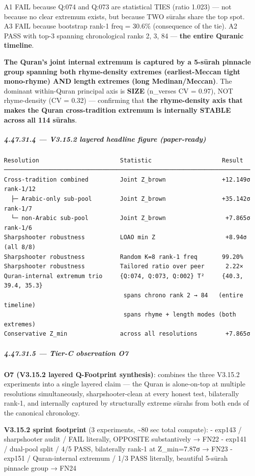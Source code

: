 \documentclass[
]{article}
\begin{document}
A1 FAIL because Q:074 and Q:073 are statistical TIES (ratio 1.023) ---
not because no clear extremum exists, but because TWO sūrahs share the
top spot. A3 FAIL because bootstrap rank-1 freq = 30.6\% (consequence of
the tie). A2 PASS with top-3 spanning chronological ranks 2, 3, 84 ---
\textbf{the entire Quranic timeline}.

\textbf{The Quran's joint internal extremum is captured by a 5-sūrah
pinnacle group spanning both rhyme-density extremes (earliest-Meccan
tight mono-rhyme) AND length extremes (long Medinan/Meccan)}. The
dominant within-Quran principal axis is \textbf{SIZE} (n\_verses CV =
0.97), NOT rhyme-density (CV = 0.32) --- confirming that \textbf{the
rhyme-density axis that makes the Quran cross-tradition extremum is
internally STABLE across all 114 sūrahs}.

\subparagraph{4.47.31.4 --- V3.15.2 layered headline figure
(paper-ready)}\label{v3.15.2-layered-headline-figure-paper-ready}

\begin{verbatim}
Resolution                       Statistic                    Result
──────────────────────────────────────────────────────────────────────
Cross-tradition combined         Joint Z_brown                +12.149σ rank-1/12
  ├─ Arabic-only sub-pool        Joint Z_brown                +35.142σ rank-1/7
  └─ non-Arabic sub-pool         Joint Z_brown                 +7.865σ rank-1/6
Sharpshooter robustness          LOAO min Z                    +8.94σ (all 8/8)
Sharpshooter robustness          Random K=8 rank-1 freq       99.20%
Sharpshooter robustness          Tailored ratio over peer      2.22×
Quran-internal extremum trio     {Q:074, Q:073, Q:002} T²     {40.3, 39.4, 35.3}
                                  spans chrono rank 2 → 84   (entire timeline)
                                  spans rhyme + length modes (both extremes)
Conservative Z_min               across all resolutions        +7.865σ
\end{verbatim}

\subparagraph{4.47.31.5 --- Tier-C observation
O7}\label{tier-c-observation-o7}

\textbf{O7 (V3.15.2 layered Q-Footprint synthesis)}: combines the three
V3.15.2 experiments into a single layered claim --- the Quran is
alone-on-top at multiple resolutions simultaneously, sharpshooter-clean
at every honest test, bilaterally rank-1, and internally captured by
structurally extreme sūrahs from both ends of the canonical chronology.

\textbf{V3.15.2 sprint footprint} (3 experiments, \textasciitilde80 sec
total compute): - exp143 / sharpshooter audit / FAIL literally, OPPOSITE
substantively → FN22 - exp141 / dual-pool split / 4/5 PASS, bilaterally
rank-1 at Z\_min=7.87σ → FN23 - exp151 / Quran-internal extremum / 1/3
PASS literally, beautiful 5-sūrah pinnacle group → FN24
\end{document}
